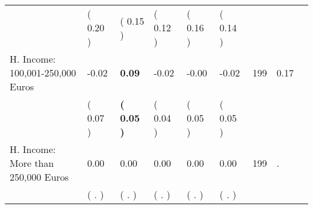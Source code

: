 \begin{tabular}{L{6.2cm} C{1.8cm} C{1.8cm} C{1.8cm} C{1.8cm} C{1.8cm} C{1.8cm} C{0.3cm} C{0.3cm}}
 & (     0.20 ) & (     0.15 ) & (     0.12 ) & (     0.16 ) & (     0.14 )  & \\
H. Income: 100,001-250,000 Euros &     -0.02 & \textbf{     0.09} &     -0.02 &     -0.00 &     -0.02  & 199 &       0.17 \\ 
 & (     0.07 ) & \textbf{(     0.05 )} & (     0.04 ) & (     0.05 ) & (     0.05 )  & \\
H. Income: More than 250,000 Euros &      0.00 &      0.00 &      0.00 &      0.00 &      0.00  & 199 &          . \\ 
 & (        . ) & (        . ) & (        . ) & (        . ) & (        . )  & \\
\bottomrule
\end{tabular}
